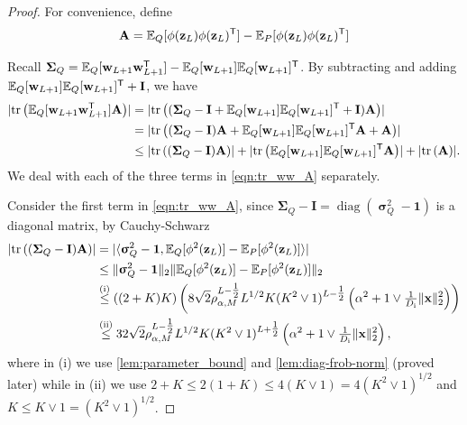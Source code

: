 \documentclass[twoside]{article}
\renewcommand{\ss}[1]{_{\text{#1}}}
\newcommand{\vw}{\mathbf{w}}
\newcommand{\vx}{\mathbf{x}}
\newcommand{\vz}{\mathbf{z}}
\newcommand{\vsigma}{\bm{\upsigma}}
\newcommand{\vone}{\mathbf{1}}
\newcommand{\mA}{\mathbf{A}}
\newcommand{\mI}{\mathbf{I}}
\newcommand{\mSigma}{\mathbf{\Sigma}}
\newcommand{\E}{\mathbb{E}}
\newcommand{\T}{\text{\textsf{T}}}
\newcommand{\opspace}{}
\newcommand{\diag}{\operatorname{diag}\opspace}
\newcommand{\tr}{\operatorname{tr}\opspace}
\renewcommand{\ss}[1]{_{\text{#1}}}        %
\DeclarePairedDelimiter\norm{\|}{\|}             %
\DeclarePairedDelimiter\abs{|}{|}                %
\theoremstyle{theoremstyle}
\begin{document}
\begin{proof}

For convenience, define 
\begin{equation}
\mA = \E_{Q}[\phi(\vz_L) \phi(\vz_L)^\T] - \E_{P}[\phi(\vz_L) \phi(\vz_L)^\T]
\end{equation}

Recall $\mSigma_Q = \E_{Q}[\vw_{L+1} \vw_{L+1}^\T] - \E_Q[\vw_{L+1}]\E_Q[\vw_{L+1}]^\T$. 
By subtracting and adding $\E_Q[\vw_{L+1}]\E_Q[\vw_{L+1}]^\T + \mI$, we have
\begin{align}
    \abs{\tr \left( \E_{Q}[\vw_{L+1} \vw_{L+1}^\T] \mA \right)}
    &=
        \abs{\tr \left( (\mSigma_Q - \mI + \E_Q[\vw_{L+1}]\E_Q[\vw_{L+1}]^\T + \mI) \mA \right)} \\
    &=
        \abs{\tr \left( (\mSigma_Q - \mI)\mA + \E_Q[\vw_{L+1}]\E_Q[\vw_{L+1}]^\T \mA + \mA \right)} \\
    &\le
        \abs{\tr \left( (\mSigma_Q - \mI)\mA \right)} 
        + \abs{\tr \left(\E_Q[\vw_{L+1}]\E_Q[\vw_{L+1}]^\T \mA\right)} 
        + \abs{\tr \left( \mA \right)}. \label{eqn:tr_ww_A}
\end{align}
We deal with each of the three terms in \cref{eqn:tr_ww_A} separately. 

Consider the first term in \cref{eqn:tr_ww_A}, since $\mSigma_Q - \mI = \diag(\vsigma_Q^2 - \vone)$ is a diagonal matrix, by Cauchy-Schwarz
\begin{align}
    \abs{\tr \left( (\mSigma_Q - \mI)\mA \right)} 
    &= \abs{\langle \vsigma_Q^2 - \vone, \E_Q[\phi^2(\vz_L)] - \E_P[\phi^2(\vz_L)] \rangle} \\
    &\le \norm{\vsigma_Q^2 - \vone}_2 \norm{\E_Q[\phi^2(\vz_L)] - \E_P[\phi^2(\vz_L)]}_2 \\
    &\overset{\smash{\text{(i)}}}{\le} \left( (2+K)K \right) \left( 8 \sqrt{2} \rho_{\alpha, M}^{L-\tfrac12} L^{1/2} K (K^2 \lor 1)^{L-\tfrac12}\left(\alpha^2 + 1\lor \tfrac1{D\ss{i}}\|\vx\|^2_2\right) \right) \\
    &\overset{\smash{\text{(ii)}}}{\le} 32 \sqrt{2} \rho_{\alpha, M}^{L-\tfrac12} L^{1/2} K (K^2 \lor 1)^{L+\tfrac12}\left(\alpha^2 + 1\lor \tfrac1{D\ss{i}}\|\vx\|^2_2\right),
\end{align}
where in (i) we use \cref{lem:parameter_bound} and \cref{lem:diag-frob-norm} (proved later) while in (ii) we use $2+K \le 2(1+K) \le 4 (K\lor 1) = 4 (K^2\lor 1)^{1/2}$ and $K \le K \lor 1 = (K^2 \lor 1)^{1/2}$.


\end{proof}
\end{document}
